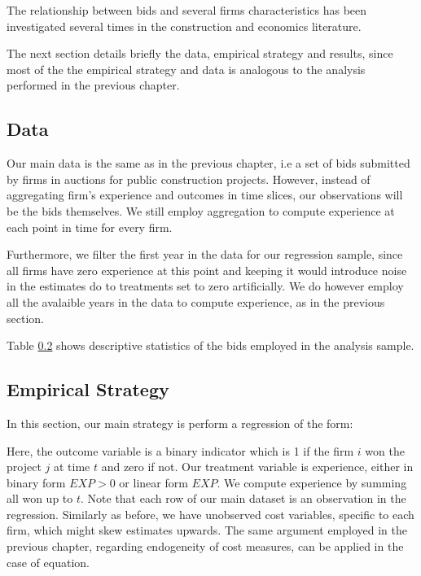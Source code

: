 The relationship between bids and several firms characteristics has been investigated several times in the construction and economics literature.

The next section details briefly the data, empirical strategy and results, since most of the the empirical strategy and data is analogous to the analysis performed in the previous chapter.

\subsection{Data}

Our main data is the same as in the previous chapter, i.e a set of bids submitted by firms in auctions for public construction projects. However, instead of aggregating firm's experience and outcomes in time slices, our observations will be the bids themselves. We still employ aggregation to compute experience at each point in time for every firm.

Furthermore, we filter the first year in the data for our regression sample, since all firms have zero experience at this point and keeping it would introduce noise in the estimates do to treatments set to zero artificially. We do however employ all the avalaible years in the data to compute experience, as in the previous section.

Table \ref{} shows descriptive statistics of the bids employed in the analysis sample.

\subsection{Empirical Strategy}
In this section, our main strategy is perform a regression of the form:



 Here, the outcome variable is a binary indicator which is 1 if the firm $i$ won the project $j$ at time $t$ and zero if not. Our treatment variable is experience, either in binary form $EXP>0$ or linear form $EXP$. We compute experience by summing all won up to $t$. Note that each row of our main dataset is an observation in the regression.
Similarly as before, we have unobserved cost variables, specific to each firm, which might skew estimates upwards. The same argument employed in the previous chapter, regarding endogeneity of cost measures, can be applied in the case of equation.

